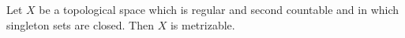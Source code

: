 \documentclass[12pt]{article}
\begin{document}
Let $X$ be a topological space which is regular and second countable and in which singleton sets are closed.  Then $X$ is metrizable.
\end{document}

